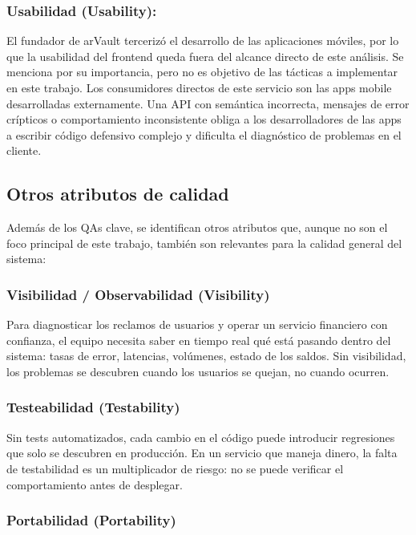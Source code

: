 \subsubsection{Usabilidad (Usability):} El fundador de arVault tercerizó el desarrollo de las aplicaciones móviles, por lo que la usabilidad del frontend queda fuera del alcance directo de este análisis. Se menciona por su importancia, pero no es objetivo de las tácticas a implementar en este trabajo. Los consumidores directos de este servicio son las apps mobile desarrolladas externamente. Una API con semántica incorrecta, mensajes de error crípticos o comportamiento inconsistente obliga a los desarrolladores de las apps a escribir código defensivo complejo y dificulta el diagnóstico de problemas en el cliente.

\subsection{Otros atributos de calidad }

Además de los QAs clave, se identifican otros atributos que, aunque no son el foco principal de este trabajo, también son relevantes para la calidad general del sistema:

\subsubsection{Visibilidad / Observabilidad (Visibility)}

Para diagnosticar los reclamos de usuarios y operar un servicio financiero con confianza, el equipo necesita saber en tiempo real qué está pasando dentro del sistema: tasas de error, latencias, volúmenes, estado de los saldos. Sin visibilidad, los problemas se descubren cuando los usuarios se quejan, no cuando ocurren.

\subsubsection{Testeabilidad (Testability)}

Sin tests automatizados, cada cambio en el código puede introducir regresiones que solo se descubren en producción. En un servicio que maneja dinero, la falta de testabilidad es un multiplicador de riesgo: no se puede verificar el comportamiento antes de desplegar.

\subsubsection{Portabilidad (Portability)}

